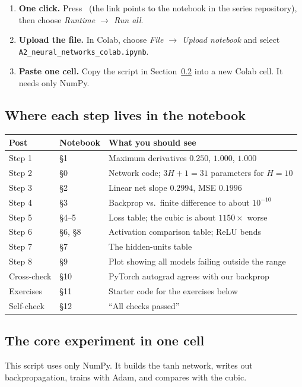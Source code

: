 \documentclass[11pt]{article}
\newcommand{\colaburl}{https://colab.research.google.com/github/YOUR-USER/YOUR-REPO/blob/main/notebooks/A2_neural_networks_colab.ipynb}
\newcommand{\colabbutton}{%
  \href{\colaburl}{\tcbox[on line,colback=orange!15,colframe=orange!70!black,boxrule=0.6pt,arc=3pt,
    left=4pt,right=4pt,top=1pt,bottom=1pt]{\small\textbf{$\blacktriangleright$ Open in Google Colab}}}}
\begin{document}
\begin{keybox}
\begin{enumerate}[nosep]
  \item \textbf{One click.} Press \colabbutton\ (the link points to the notebook in the series repository), then choose \emph{Runtime $\to$ Run all}.
  \item \textbf{Upload the file.} In Colab, choose \emph{File $\to$ Upload notebook} and select \texttt{A2\_neural\_networks\_colab.ipynb}.
  \item \textbf{Paste one cell.} Copy the script in Section~\ref{sec:onecell} into a new Colab cell. It needs only NumPy.
\end{enumerate}
\end{keybox}

\subsection{Where each step lives in the notebook}
\begin{center}
\small
\begin{tabular}{@{}llp{6.8cm}@{}}
\toprule
Post & Notebook & What you should see\\
\midrule
Step 1 & \S1 & Maximum derivatives $0.250$, $1.000$, $1.000$\\
Step 2 & \S0 & Network code; $3H+1=31$ parameters for $H=10$\\
Step 3 & \S2 & Linear net slope $0.2994$, MSE $0.1996$\\
Step 4 & \S3 & Backprop vs.\ finite difference to about $10^{-10}$\\
Step 5 & \S4--5 & Loss table; the cubic is about $1150\times$ worse\\
Step 6 & \S6, \S8 & Activation comparison table; ReLU bends\\
Step 7 & \S7 & The hidden-units table\\
Step 8 & \S9 & Plot showing all models failing outside the range\\
Cross-check & \S10 & PyTorch autograd agrees with our backprop\\
Exercises & \S11 & Starter code for the exercises below\\
Self-check & \S12 & ``All checks passed''\\
\bottomrule
\end{tabular}
\end{center}

\subsection{The core experiment in one cell}
\label{sec:onecell}
This script uses only NumPy. It builds the tanh network, writes out backpropagation, trains with Adam, and compares with the cubic.
\end{document}
